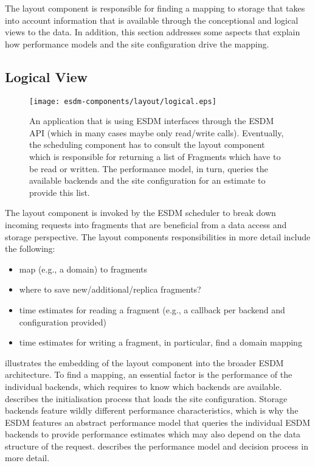 
The layout component is responsible for finding a mapping to storage that takes into account information that is available through the conceptional and logical views to the data.
In addition, this section addresses some aspects that explain how performance models and the site configuration drive the mapping.


\subsection{Logical View}

\begin{figure}
	\centering
	\texttt{[image: esdm-components/layout/logical.eps]}
	\caption{An application that is using ESDM interfaces through the ESDM API (which in many cases maybe only read/write calls). Eventually, the scheduling component has to consult the layout component which is responsible for returning a list of Fragments which have to be read or written. The performance model, in turn, queries the available backends and the site configuration for an estimate to provide this list.}
	\label{fig:esdm layout logical view}
\end{figure}

The layout component is invoked by the ESDM scheduler to break down incoming requests into fragments that are beneficial from a data access and storage perspective.
The layout components responsibilities in more detail include the following:

\begin{itemize}
	\item map (e.g., a domain) to fragments
	\item where to save new/additional/replica fragments?
	\item time estimates for reading a fragment (e.g., a callback per backend and configuration provided)
	\item time estimates for writing a fragment, in particular, find a domain mapping
\end{itemize}

 illustrates the embedding of the layout component into the broader ESDM architecture.
To find a mapping, an essential factor is the performance of the individual backends, which requires to know which backends are available.
 describes the initialisation process that loads the site configuration.
Storage backends feature wildly different performance characteristics, which is why the ESDM features an abstract performance model that queries the individual ESDM backends to provide performance estimates which may also depend on the data structure of the request.
 describes the performance model and decision process in more detail.

